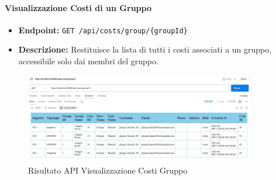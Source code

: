 \paragraph{Visualizzazione Costi di un Gruppo}  

\begin{itemize}
    \item \textbf{Endpoint:} \texttt{GET /api/costs/group/\{groupId\}}
    \item \textbf{Descrizione:} Restituisce la lista di tutti i costi associati a un gruppo, accessibile solo dai membri del gruppo.
\end{itemize}

\begin{figure}[h!]
    \centering
    \includegraphics[width=0.9\textwidth]{images/getGroupCosts.jpeg}
    \caption{Risultato API Visualizzazione Costi Gruppo}
    \label{fig:api_view_group_costs}
\end{figure}

